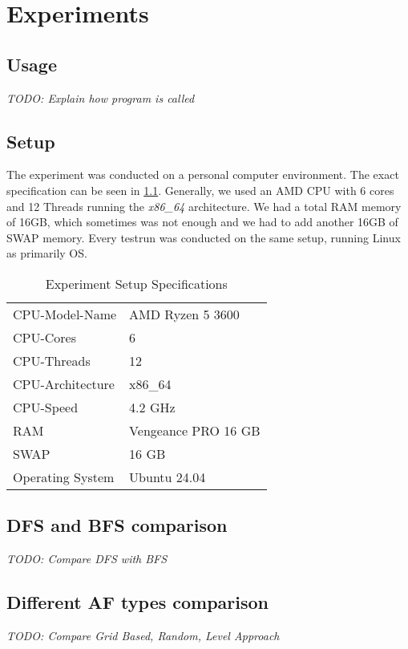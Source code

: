 \chapter{Experiments}

\section{Usage}
\textit{TODO: Explain how program is called}

\section{Setup}
The experiment was conducted on a personal computer environment. The exact specification can be seen in \cref{table:ExperimentSpecs}. Generally, we used an AMD CPU with 6 cores and 12 Threads running the \textit{x86\_64} architecture. We had a total RAM memory of 16GB, which sometimes was not enough and we had to add another 16GB of SWAP memory. Every testrun was conducted on the same setup, running Linux as primarily OS.


\begin{table}[htb]
    \centering
    \caption{Experiment Setup Specifications}
    \begin{tabular}{ |l|l| }
     \hline
     CPU-Model-Name & AMD Ryzen 5 3600\\
     CPU-Cores & 6\\
     CPU-Threads & 12\\
     CPU-Architecture & x86\_64\\
     CPU-Speed & 4.2 GHz\\
     RAM & Vengeance PRO 16 GB\\
     SWAP & 16 GB\\
     Operating System & Ubuntu 24.04 \\
     \hline
    \end{tabular}
\label{table:ExperimentSpecs}
\end{table}

\section{DFS and BFS comparison}
\textit{TODO: Compare DFS with BFS}

\section{Different AF types comparison}
\textit{TODO: Compare Grid Based, Random, Level Approach}